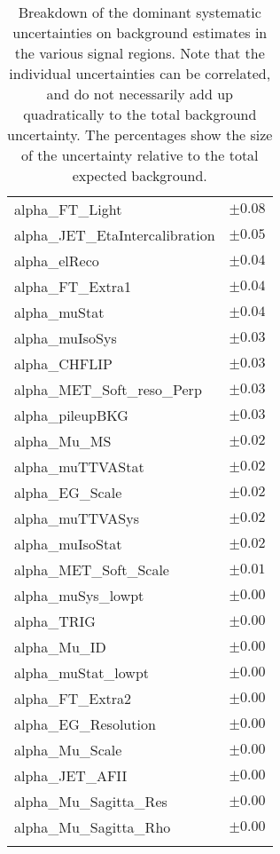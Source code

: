 \begin{table}
\begin{center}
\begin{tabular*}{\textwidth}{@{\extracolsep{\fill}}lc}
alpha\_FT\_Light         & $\pm 0.08$       \\
alpha\_JET\_EtaIntercalibration         & $\pm 0.05$       \\
alpha\_elReco         & $\pm 0.04$       \\
alpha\_FT\_Extra1         & $\pm 0.04$       \\
alpha\_muStat         & $\pm 0.04$       \\
alpha\_muIsoSys         & $\pm 0.03$       \\
alpha\_CHFLIP         & $\pm 0.03$       \\
alpha\_MET\_Soft\_reso\_Perp         & $\pm 0.03$       \\
alpha\_pileupBKG         & $\pm 0.03$       \\
alpha\_Mu\_MS         & $\pm 0.02$       \\
alpha\_muTTVAStat         & $\pm 0.02$       \\
alpha\_EG\_Scale         & $\pm 0.02$       \\
alpha\_muTTVASys         & $\pm 0.02$       \\
alpha\_muIsoStat         & $\pm 0.02$       \\
alpha\_MET\_Soft\_Scale         & $\pm 0.01$       \\
alpha\_muSys\_lowpt         & $\pm 0.00$       \\
alpha\_TRIG         & $\pm 0.00$       \\
alpha\_Mu\_ID         & $\pm 0.00$       \\
alpha\_muStat\_lowpt         & $\pm 0.00$       \\
alpha\_FT\_Extra2         & $\pm 0.00$       \\
alpha\_EG\_Resolution         & $\pm 0.00$       \\
alpha\_Mu\_Scale         & $\pm 0.00$       \\
alpha\_JET\_AFII         & $\pm 0.00$       \\
alpha\_Mu\_Sagitta\_Res         & $\pm 0.00$       \\
alpha\_Mu\_Sagitta\_Rho         & $\pm 0.00$       \\
\noalign{\smallskip}\hline\noalign{\smallskip}
\end{tabular*}
\end{center}
\caption[Breakdown of uncertainty on background estimates]{
Breakdown of the dominant systematic uncertainties on background estimates in the various signal regions.
Note that the individual uncertainties can be correlated, and do not necessarily add up quadratically to 
the total background uncertainty. The percentages show the size of the uncertainty relative to the total expected background.
\label{table.results.bkgestimate.uncertainties.Rpc3L0bS}}
\end{table}
\clearpage
%